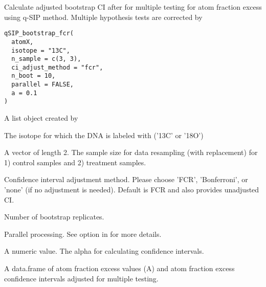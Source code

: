 \documentclass[a4paper]{book}
\begin{document}
%
\begin{Description}\relax
Calculate adjusted bootstrap CI after for multiple testing for atom fraction excess using q-SIP method. Multiple hypothesis tests are corrected by
\end{Description}
%
\begin{Usage}
\begin{verbatim}
qSIP_bootstrap_fcr(
  atomX,
  isotope = "13C",
  n_sample = c(3, 3),
  ci_adjust_method = "fcr",
  n_boot = 10,
  parallel = FALSE,
  a = 0.1
)
\end{verbatim}
\end{Usage}
%
\begin{Arguments}
\begin{ldescription}
\item[\code{atomX}] A list object created by 

\item[\code{isotope}] The isotope for which the DNA is labeled with ('13C' or '18O')

\item[\code{n\_sample}] A vector of length 2. The sample size for data resampling (with replacement) for 1) control samples and 2) treatment samples.

\item[\code{ci\_adjust\_method}] Confidence interval adjustment method. Please choose 'FCR', 'Bonferroni', or 'none' (if no adjustment is needed). Default is FCR and also provides unadjusted CI.

\item[\code{n\_boot}] Number of bootstrap replicates.

\item[\code{parallel}] Parallel processing. See  option in  for more details.

\item[\code{a}] A numeric value. The alpha for calculating confidence intervals.
\end{ldescription}
\end{Arguments}
%
\begin{Value}
A data.frame of atom fraction excess values (A) and atom fraction excess confidence intervals adjusted for multiple testing.
\end{Value}
\end{document}
